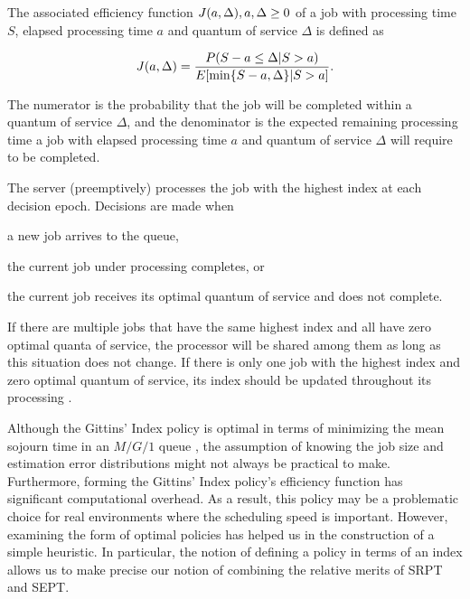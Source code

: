 The associated efficiency function $J(a,\Delta ),{\rm{ }}a,{\rm{ }}\Delta  \ge 0$ of a job
with processing time $S$, elapsed processing time $a$ and quantum of service $\Delta $ is defined as




\begin{equation}\label{eq:1} J(a,\Delta ) = \frac{{P(S - a \le \Delta |S > a)}}{{E[\min \{ S - a,{\rm{
}}\Delta \} |S > a]}}.
\end{equation} 




The numerator is the probability that the job will be completed within a quantum of service $\Delta $, and the denominator is
the expected remaining processing time a job with elapsed processing time $a$ and quantum of service
$\Delta $ will require to be completed.

The server (preemptively) processes the job with the highest
index at each decision epoch. Decisions are made when  \begin {enumerate*}  \item a
new job arrives to the queue, \item the current job under processing completes, or \item
the current job receives its optimal quantum of service and
does not complete.\end {enumerate*} If there are multiple jobs that have the same highest
index and all have zero optimal quanta of service, the processor will be shared
among them as long as this situation does not change. If there is only one job
with the highest index and zero optimal quantum of service, its index should be
updated throughout its processing \cite {aalto2009gittins}. 

Although the Gittins' Index policy is optimal in terms of minimizing the mean
sojourn time in an $M/G/1$ queue \cite {aalto2009gittins}, the assumption of knowing the job size and estimation error distributions might not always be practical to make. Furthermore, forming the Gittins' Index policy's efficiency function has significant computational overhead. As a result, this policy may be a problematic choice for real environments where the scheduling speed is important. However, examining the form of optimal policies has helped us in the construction of a simple heuristic. In particular, the notion of defining a policy in terms of an index allows us to make precise our notion of combining the relative merits of SRPT and SEPT. 

